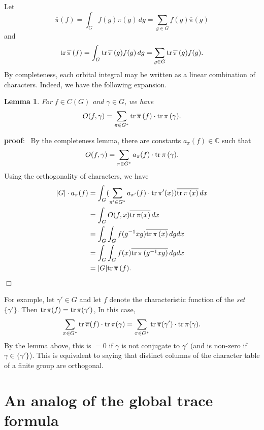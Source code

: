 \documentclass[12pt]{article}
\newtheorem{lemma}[theorem]{Lemma}
\def\ccc{\mathbb{C}}
\def\pf{{\bf proof}:\ }
\def\qed{$\Box$}
\begin{document}
Let 
\[
\overline{\pi}(f) = \int_G f(g)\overline{\pi(g)}\, dg
=\sum_{g\in G} f(g)\overline{\pi}(g)
\]
and
\[
{\rm tr}\,\overline{\pi}\,(f)=
\int_G {\rm tr}\,\overline{\pi}\,(g)f(g)\, dg
=\sum_{g\in G} {\rm tr}\,\overline{\pi}\,(g)f(g).
\]
By completeness, each orbital integral may be written as a linear
combination of characters. Indeed, we have the following
expansion.

\begin{lemma} For $f\in C(G)$ and $\gamma\in G$, we have
\begin{equation}
O(f,\gamma)
=\sum_{\pi\in G^*}
 {\rm tr}\,\overline{\pi}\, (f)\cdot {\rm tr}\,\pi\,(\gamma).
\label{eq:2.1}
\end{equation}

\end{lemma}

\pf 
By the completeness lemma, there are constants
$a_\pi(f)\in \ccc$ such that
\[
O(f,\gamma)=\sum_{\pi\in G^*} a_\pi(f)\cdot {\rm tr}\,\pi\,(\gamma).
\]
Using the orthogonality of characters, we have
\[
\begin{split}
|G|\cdot a_\pi(f)
&=\int_G (\sum_{\pi'\in G^*} a_{\pi'}(f)\cdot 
{\rm tr}\,\pi'(x))\overline{{\rm tr}\,\pi\, (x)}\, dx\\
&=\int_G O(f,x)\overline{{\rm tr}\,\pi(x)}\, dx\\
&=\int_G \int_G f(g^{-1}xg)\overline{{\rm tr}\,\pi\,(x)}\, dgdx\\
&=\int_G \int_G f(x)\overline{{\rm tr}\,\pi\,(g^{-1}xg)}\, dgdx\\
&=|G|{\rm tr}\,\overline{\pi}\,(f).
\end{split}
\]
\qed

For example, let $\gamma'\in G$ and 
let $f$ denote the characteristic function of the
{\it set} $\{\gamma'\}$. Then
${\rm tr}\,{\pi}(f)=
{\rm tr}\,{\pi}(\gamma')$,
In this case,
\[
\sum_{\pi\in G^*}
 {\rm tr}\,\overline{\pi}(f)\cdot {\rm tr}\,\pi(\gamma)
=\sum_{\pi\in G^*}
 {\rm tr}\,\overline{\pi}(\gamma')\cdot {\rm tr}\,\pi(\gamma).
\]
By the lemma above, this is $=0$ if
$\gamma$ is not conjugate to $\gamma'$
(and is non-zero if $\gamma\in \{\gamma'\}$).
This is equivalent to saying that
distinct columns of the character table of a finite group are orthogonal.


\section{An analog of the global trace formula}
\end{document}
